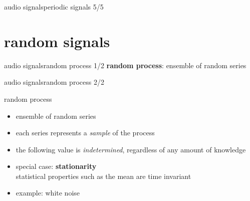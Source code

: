 \begin{frame}{audio signals}{periodic signals 5/5}
{{                
                }
            }	
        \end{frame}
        

    \section[random signals]{random signals}
        \begin{frame}{audio signals}{random process 1/2}
            \textbf{random process}: ensemble of random series
        \end{frame}

        \begin{frame}{audio signals}{random process 2/2}
            \begin{block}{random process}
                \begin{itemize}
                    \item   ensemble of random series
                    \item   each series represents a \textit{sample} of the process
                    \item   the following value is \textit{indetermined}, regardless of any amount of knowledge
                \end{itemize}
            \end{block}
            \begin{itemize}
                \item   special case: \textbf{stationarity}\\ statistical properties such as the mean are time invariant
                \item   example: white noise
            \end{itemize}
        \end{frame}

